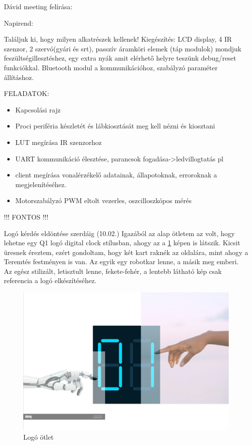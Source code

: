 \documentclass{article}
\begin{document}
Dávid meeting felírása:

\vspace{5mm} %

Napirend:

Találjuk ki, hogy milyen alkatrészek kellenek!
Kiegészítés: LCD display, 4 IR szenzor, 2 szervó(gyári és srt), passzív áramköri elemek (táp modulok) mondjuk feszültségillesztéshez, egy extra nyák amit elérhető helyre teszünk debug/reset funkciókkal. Bluetooth modul a kommunikációhoz, szabályzó paraméter állításhoz.

\vspace{5mm} %

FELADATOK:
\begin{itemize}
\item Kapcsolási rajz
\item Proci periféria készletét és lábkiosztását meg kell nézni és kiosztani
\item LUT megírása IR szenzorhoz
\item UART kommunikáció élesztése, parancsok fogadása->ledvillogtatás pl
\item client megírása vonalérzékelő adatainak, állapotoknak, erroroknak a megjelenítéséhez.
\item Motorszabályzó PWM eltolt vezerles, oszcilloszkópos mérés
\end{itemize}

!!! FONTOS !!!

\vspace{5mm} %

Logó kérdés eldöntése szerdáig (10.02.)
Igazából az alap ötletem az volt, hogy lehetne egy Q1 logó digital clock stílusban, ahogy az a \ref{fig:logo_v0} képen is látszik. Kicsit üresnek éreztem, ezért gondoltam, hogy két kart raknék az oldalára, mint ahogy a Teremtés festményen is van. Az egyik egy robotkar lenne, a másik meg emberi. Az egész stilizált, letisztult lenne, fekete-fehér, a lentebb látható kép csak referencia a logó elkészítéséhez.

\newpage
\begin{figure}
      \centering
      \includegraphics[width=0.5\linewidth]{logo_v0.png}
      \caption{\label{fig:logo_v0}Logó ötlet}
      \end{figure}
\end{document}
